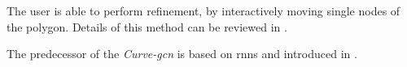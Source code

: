 The user is able to perform refinement, by interactively moving single nodes of the polygon.
Details of this method can be reviewed in \cite{Ling19-Curve-GCN}.

The predecessor of the \textit{Curve-\gls{gcn}} is based on \glspl{rnn} and introduced in \cite{Acu18-Polygon-RNN++}.





